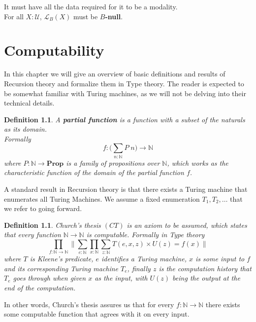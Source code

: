 \documentclass[12pt]{report}
\newtheorem{defn}[thm]{Definition}
\begin{document}
It must have all the data required for it to be a modality.\\
For all $X : \mathcal{U}$, $\mathcal{L}_B(X)$ must be $B$\textbf{-null}.

\chapter{Computability}
In this chapter we will give an overview of basic definitions and results of Recursion theory and formalize them in Type theory. 
The reader is expected to be somewhat familiar with Turing machines, as we will not be delving into their technical details. 

\begin{defn}
A \textbf{partial function} is a function with a subset of the naturals as its domain.\\
Formally 
$$f : \Big(\sum_{n : \mathbb{N}} P\; n \Big) \rightarrow \mathbb{N}$$
where $P : \mathbb{N} \rightarrow \mathbf{Prop}$ is a family of propositions over $\mathbb{N}$, which works as the characteristic function of the domain of the partial function $f$.
\end{defn}

A standard result in Recursion theory is that there exists a Turing machine that enumerates all Turing Machines. 
We assume a fixed enumeration $T_1, T_2,\ldots $ that we refer to going forward. 

\begin{defn}\label{CT}
Church's thesis $(CT)$ is an axiom to be assumed, which states that every function $\mathbb{N}\rightarrow \mathbb{N}$ is computable. 
Formally in Type theory
$$\prod_{f : \mathbb{N}\rightarrow \mathbb{N}} \Big\lVert \sum_{e : \mathbb{N}} \prod_{x : \mathbb{N}} \sum_{z : \mathbb{N}} T(e,x,z) \times U(z) = f(x) \Big\rVert$$
where $T$ is Kleene's predicate, $e$ identifies a Turing machine, $x$ is some input to $f$ and its corresponding Turing machine $T_e$, finally $z$ is the computation history that $T_e$ goes through when given $x$ as the input, with $U(z)$ being the output at the end of the computation.
\end{defn}

In other words, Church's thesis assures us that for every $f : \mathbb{N} \rightarrow \mathbb{N}$ there exists some computable function that agrees with it on every input.
\end{document}
